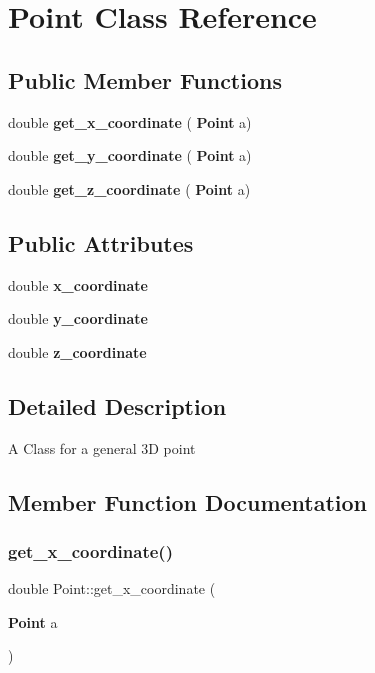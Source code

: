 \section{Point Class Reference}
\label{class_point}
\subsection*{Public Member Functions}
\begin{DoxyCompactItemize}
\item 
double \textbf{ get\+\_\+x\+\_\+coordinate} (\textbf{ Point} a)
\item 
double \textbf{ get\+\_\+y\+\_\+coordinate} (\textbf{ Point} a)
\item 
double \textbf{ get\+\_\+z\+\_\+coordinate} (\textbf{ Point} a)
\end{DoxyCompactItemize}
\subsection*{Public Attributes}
\begin{DoxyCompactItemize}
\item 
double \textbf{ x\+\_\+coordinate}
\item 
double \textbf{ y\+\_\+coordinate}
\item 
double \textbf{ z\+\_\+coordinate}
\end{DoxyCompactItemize}


\subsection{Detailed Description}
A Class for a general 3D point 

\subsection{Member Function Documentation}
\mbox{\label{class_point_ade28f805f569193c6b181421c6907ea7}} 
\subsubsection{get\+\_\+x\+\_\+coordinate()}
{\footnotesize\ttfamily double Point\+::get\+\_\+x\+\_\+coordinate (\begin{DoxyParamCaption}\item[{\textbf{ Point}}]{a }\end{DoxyParamCaption})\hspace{0.3cm}{\ttfamily [inline]}}

